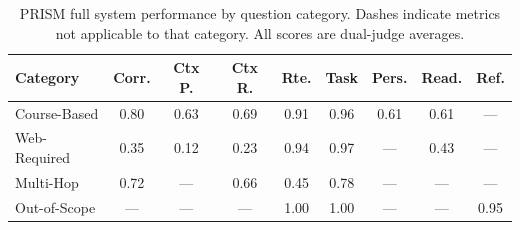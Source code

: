 \begin{table}[t]
\centering
\small
\caption{PRISM full system performance by question category. Dashes indicate metrics not applicable to that category. All scores are dual-judge averages.}
\label{tab:categories}
\begin{tabular}{@{}lcccccccc@{}}
\toprule
Category & Corr. & Ctx P. & Ctx R. & Rte. & Task & Pers. & Read. & Ref. \\
\midrule
Course-Based & 0.80 & 0.63 & 0.69 & 0.91 & 0.96 & 0.61 & 0.61 & --- \\
Web-Required & 0.35 & 0.12 & 0.23 & 0.94 & 0.97 & --- & 0.43 & --- \\
Multi-Hop & 0.72 & --- & 0.66 & 0.45 & 0.78 & --- & --- & --- \\
Out-of-Scope & --- & --- & --- & 1.00 & 1.00 & --- & --- & 0.95 \\
\bottomrule
\end{tabular}
\end{table}

